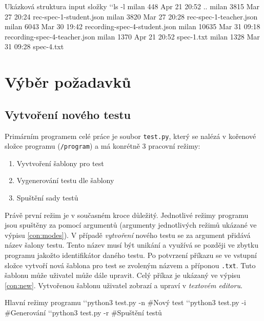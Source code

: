 \documentclass[czech, ma, kiv, he, iso690numb, pdf, viewonly]{fasthesis}
\begin{document}
    \newpage
    \begin{console}{Ukázková struktura input složky \label{con:input}} 
`\uxprompt`ls -l
milan    448 Apr 21 20:52 ..
milan   3815 Mar 27 20:24 rec-spec-1-student.json
milan   3820 Mar 27 20:28 rec-spec-1-teacher.json
milan   6043 Mar 30 19:42 recording-spec-4-student.json
milan  10635 Mar 31 09:18 recording-spec-4-teacher.json
milan   1370 Apr 21 20:52 spec-1.txt
milan   1328 Mar 31 09:28 spec-4.txt
    \end{console}

    \section{Výběr požadavků}

        \subsection{Vytvoření nového testu} \label{sec:test_creation}

            Primárním programem celé práce je soubor \verb|test.py|, který se nalézá v kořenové složce programu (\verb|/program|) a má konrétně 3 pracovní režimy:
            \begin{enumerate}
                \item Vyvtvoření šablony pro test
                \item Vygenerování testu dle šablony
                \item Spuštění sady testů
            \end{enumerate}
            Právě první režim je v současném kroce důležitý. Jednotlivé režimy programu jsou spuštěny za pomocí argumentů (argumenty jednotlivých režimů ukázané ve výpisu \ref{con:modes}). V případě \textit{vytvoření} nového testu se za argument přidává název šalony testu. Tento název musí být unikání a využívá se později ve zbytku programu jakožto identifikátor daného testu. Po potvrzení příkazu se ve vstupní složce vytvoří nová šablona pro test se zvoleným názvem a příponou \verb|.txt|. Tuto šablonu může uživatel může dále upravit. Celý příkaz je ukázaný ve výpisu \ref{con:new}. Vytvořenou šablonu uživatel zobrazí a upraví v \textit{textovém editoru}.

            \vfill

            \begin{console}{Hlavní režimy programu \label{con:modes}}
`\uxprompt`python3 test.py -n   #Nový test
`\uxprompt`python3 test.py -i   #Generování
`\uxprompt`python3 test.py -r   #Spuštění testů
            \end{console}
\end{document}
